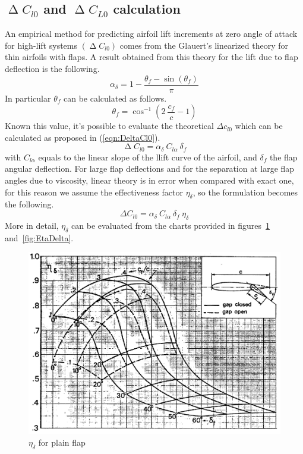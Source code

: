 \subsection{$\upDelta C_{l0}$ and  $\upDelta C_{L0}$ calculation}
An empirical method for predicting airfoil lift increments at zero angle of attack for high-lift systems $\left(\upDelta C_{l0}\right)$ comes from the Glauert’s linearized theory for thin airfoils with flaps. A result obtained from this theory for the lift due to flap deflection is the following.
%
\begin{equation}
\alpha_\delta=1-\frac{\theta_f-\sin(\theta_f)}{\pi}
\label{eqn:AlphaDelta}
\end{equation}
%
\noindent
In particular $\theta_f$ can be calculated as follows.
%
\begin{equation}
\theta_f=\cos^{-1}\left(2\ \frac{c_f}{c}-1\right)
\label{eqn:ThetaF}
\end{equation}
%
\noindent
Known this value, it's possible to evaluate the theoretical $\Delta c_{l0}$ which can be calculated as proposed in (\ref{eqn:DeltaCl0}).
%
\begin{equation}
\upDelta C_{l0}=\alpha_\delta\ C_{l\alpha}\ \delta_f
\label{eqn:DeltaCl0}
\end{equation}
%
with $C_{l\alpha}$ equals to the linear slope of the llift curve of the airfoil, and $\delta_{f}$ the flap angular deflection. For large flap deflections and for the separation at large flap angles due to viscosity, linear theory is in error when compared with exact one, for this reason we assume the effectiveness factor $\eta_\delta$, so the formulation becomes the following.
%
\begin{equation}
\Delta C_{l0}=\alpha_\delta\ C_{l\alpha}\ \delta_f\ \eta_\delta
\label{eqn:DeltaCl0EtaDelta}
\end{equation}
%
More in detail, $\eta_\delta$ can be evaluated from the charts provided in figures~\ref{fig:EtaDeltaPlain} and~\ref{fig:EtaDelta}.
%
\begin{figure}[!t]
  \centering
  \includegraphics[width=0.7\linewidth]{Eta_Delta_Plain}
  \caption{$\eta_\delta$ for plain flap}
  \label{fig:EtaDeltaPlain}
\end{figure}
